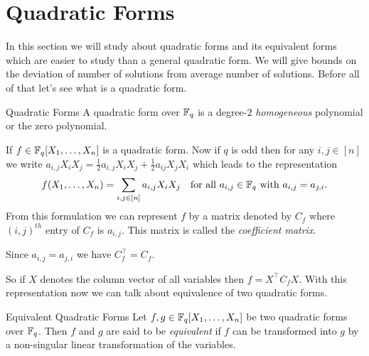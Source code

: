 \section{Quadratic Forms}\label{sec:quadratic-forms}
In this section we will study about quadratic forms and its equivalent forms which are easier to study than a general quadratic form. We will give bounds on the deviation of number of solutions from average number of solutions. Before all of that let's see what is a quadratic form.
\begin{Definition}{Quadratic Forms}{}
  A quadratic form over $\mathbb{F}_q$ is a degree-$2$ \emph{homogeneous} polynomial or the zero polynomial.
\end{Definition}
If $f\in\mathbb{F}_q[X_1,\dots,X_n]$ is a quadratic form. Now if $q$ is odd then for any $i,j\in[n]$ we write $a_{i,j}X_iX_j=\frac12a_{i,j}X_iX_j+\frac12a_{ij}X_jX_i$ which leads to the representation $$f(X_1,\dots, X_n)= \sum_{i,j\in[n]}a_{i,j}X_iX_j\quad\text{for all }a_{i,j}\in\mathbb{F}_q\text{ with }a_{i,j}=a_{j,i}.$$
From this formulation we can represent $f$ by a matrix denoted by $C_f$ where $(i,j)^{th}$ entry of $C_f$ is $a_{i,j}$. This matrix is called the \emph{coefficient matrix}.
\begin{observation}\label{obs:coeff-matrix-symmetric}
  Since $a_{i,j}=a_{j,i}$ we have $C_f^\top=C_f$.
\end{observation}
So if $X$ denotes the column vector of all variables then $f=X^\top C_fX$. With this representation now we can talk about equivalence of two quadratic forms.
\begin{Definition}{Equivalent Quadratic Forms}{}
  Let $f,g\in\mathbb{F}_q[X_1,\dots, X_n]$ be two quadratic forms over $\mathbb{F}_q$. Then $f$ and $g$ are said to be \emph{equivalent} if $f$ can be transformed into $g$ by a non-singular linear transformation of the variables.
\end{Definition}

